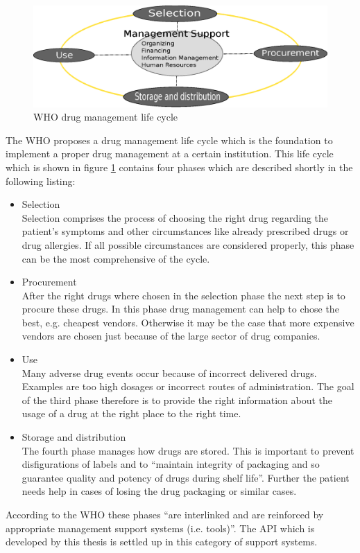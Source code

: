 \begin{figure}
  \centering
  \includegraphics[width=\textwidth]{preliminaries/life_cycle.eps}
  \caption{WHO drug management life cycle}
  \label{fig:life_cycle}
\end{figure}
The WHO proposes a drug management life cycle which is the foundation to implement a proper drug management at a certain institution.
This life cycle which is shown in figure \ref{fig:life_cycle} contains four phases which are described shortly in the following listing:
\begin{itemize}
\item Selection\\
  Selection comprises the process of choosing the right drug regarding the patient's symptoms and other circumstances like already prescribed drugs or drug allergies.
  If all possible circumstances are considered properly, this phase can be the most comprehensive of the cycle.
\item Procurement\\
  After the right drugs where chosen in the selection phase the next step is to procure these drugs.
  In this phase drug management can help to chose the best, e.g. cheapest vendors.
  Otherwise it may be the case that more expensive vendors are chosen just because of the large sector of drug companies.
\item Use\\
  Many adverse drug events occur because of incorrect delivered drugs.
  Examples are too high dosages or incorrect routes of administration.
  The goal of the third phase therefore is to provide the right information about the usage of a drug at the right place to the right time.
\item Storage and distribution\\
  The fourth phase manages how drugs are stored.
  This is important to prevent disfigurations of labels and to ``maintain integrity of packaging and so guarantee quality and potency of drugs during shelf life''.
  Further the patient needs help in cases of losing the drug packaging or similar cases.
\end{itemize}
According to the WHO these phases ``are interlinked and are reinforced by appropriate management support systems (i.e. tools)''.
The API which is developed by this thesis is settled up in this category of support systems.

